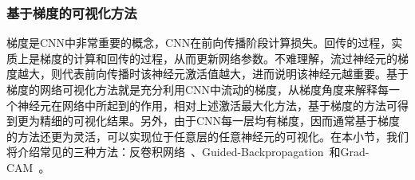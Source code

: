 \subsubsection*{基于梯度的可视化方法}
梯度是CNN中非常重要的概念，CNN在前向传播阶段计算损失。回传的过程，实质上是梯度的计算和回传的过程，从而更新网络参数。不难理解，流过神经元的梯度越大，则代表前向传播时该神经元激活值越大，进而说明该神经元越重要。基于梯度的网络可视化方法就是充分利用CNN中流动的梯度，从梯度角度来解释每一个神经元在网络中所起到的作用，相对上述激活最大化方法，基于梯度的方法可得到更为精细的可视化结果。另外，由于CNN每一层均有梯度，因而通常基于梯度的方法还更为灵活，可以实现位于任意层的任意神经元的可视化。在本小节，我们将介绍常见的三种方法：反卷积网络~\cite{zeiler2010deconvolutional}、Guided-Backpropagation~\cite{springenberg2014striving}和Grad-CAM~\cite{selvaraju2017grad}。

